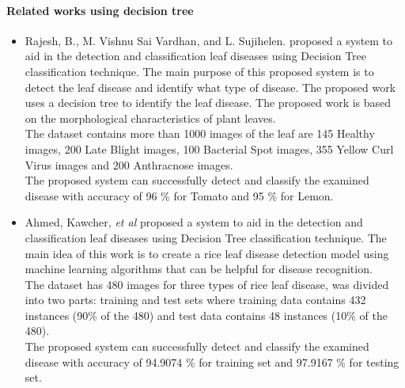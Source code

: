 \paragraph{Related works using decision tree}
\begin{itemize}
    \item Rajesh, B., M. Vishnu Sai Vardhan, and L. Sujihelen. \cite{art15} proposed a system to aid in the detection and classification leaf diseases using Decision Tree classification technique. The main purpose of this proposed system is to detect the leaf disease and identify what type of disease. The proposed work uses a decision tree to identify the leaf disease. The proposed work is based on the morphological characteristics of plant leaves. \vspace{4mm}\\
    The dataset contains more than 1000 images of the leaf are 145 Healthy images, 200 Late Blight images, 100 Bacterial Spot images, 355 Yellow Curl Virus images and 200 Anthracnose images.\vspace{4mm} \\
    The proposed system can successfully detect and classify the examined disease with accuracy of 96 \% for Tomato and 95 \% for Lemon.
    \item Ahmed, Kawcher, \textit{et al} \cite{art16} proposed a system to aid in the detection and classification leaf diseases using Decision Tree classification technique. The main idea of this work is to create a rice leaf disease detection model using machine learning algorithms that can be helpful for disease recognition. \vspace{4mm}\\
    The dataset has 480 images for three types of rice leaf disease, was divided into two parts: training and test sets where training data contains 432 instances (90\% of the 480) and test data contains 48 instances (10\% of the 480).\vspace{4mm}\\
    The proposed system can successfully detect and classify the examined disease with accuracy of 94.9074 \% for training set and 97.9167 \% for testing set.


\end{itemize}
